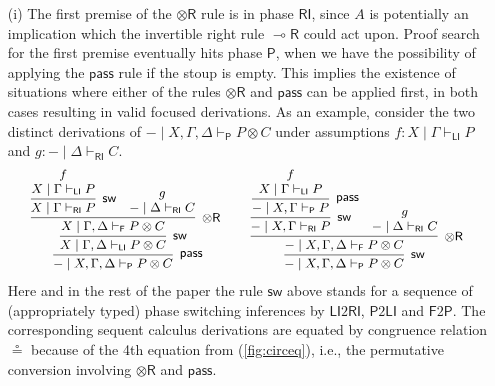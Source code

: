 \documentclass[copyright,creativecommons]{eptcs}
\theoremstyle{definition}
\newcommand{\tr}{\otimes \mathsf{R}}
\newcommand{\lright}{{\multimap}\mathsf{R}}
\newcommand{\pass}{\mathsf{pass}}
\newcommand{\ot}{\otimes}
\newcommand{\RI}{\mathsf{RI}}
\newcommand{\LI}{\mathsf{LI}}
\newcommand{\Pass}{\mathsf{P}}
\newcommand{\F}{\mathsf{F}}
\newcommand{\proofbox}[1]{\begin{tabular}{l} #1 \end{tabular}}
\begin{document}
\begin{enumerate}

\item[(i)] The first premise of the $\tr$ rule is in phase $\RI$, since $A$ is potentially an implication which the invertible right rule $\lright$ could act upon. Proof search for the first premise eventually hits phase $\Pass$, when we have the possibility of applying the $\pass$ rule if the stoup is empty. This implies the existence of situations where either of the rules $\tr$ and $\pass$ can be applied first, in both cases resulting in valid focused derivations.
  As an example, consider the two distinct derivations of ${-} \mid X , \Gamma , \Delta \vdash_{\Pass} P \ot C$ under assumptions $f : X \mid \Gamma \vdash_{\LI} P$ and $g : {-} \mid \Delta \vdash_{\RI} C$.
  \begin{equation}\label{eq:passtr}
  \small
    \proofbox{
      \infer[\pass]{{-} \mid X , \Gamma , \Delta \vdash_{\Pass} P \ot C}{
        \infer[\mathsf{sw}]{X \mid \Gamma , \Delta \vdash_{\LI} P \ot C}{
          \infer[\tr]{X \mid \Gamma , \Delta \vdash_{\F} P \ot C}{
            \infer[\mathsf{sw}]{X \mid \Gamma \vdash_{\RI} P}{
              \deduce{X \mid \Gamma \vdash_{\LI} P}{f}
            }
            &
            \deduce{{-} \mid \Delta \vdash_{\RI} C}{g}
          }
        }
      }
    \qquad
    \infer[\mathsf{sw}]{{-} \mid X , \Gamma , \Delta \vdash_{\Pass} P \ot C}{
      \infer[\tr]{{-} \mid X , \Gamma , \Delta \vdash_{\F} P \ot C}{
        \infer[\mathsf{sw}]{{-} \mid X , \Gamma \vdash_{\RI} P}{
          \infer[\pass]{{-} \mid X , \Gamma \vdash_{\Pass} P}{
            \deduce{X \mid \Gamma \vdash_{\LI} P}{f}
          }
        }
        &
        \deduce{{-} \mid \Delta \vdash_{\RI} C}{g}
      }
    }
    }
  \end{equation}
  Here and in the rest of the paper the rule $\mathsf{sw}$ above stands for a sequence of (appropriately typed) phase
  switching inferences by $\LI2\RI$, $\Pass2\LI$ and $\F2\Pass$.
  The corresponding sequent calculus derivations are equated by congruence relation $\circeq$ because of the 4th equation from (\ref{fig:circeq}), i.e., the permutative conversion involving $\tr$ and $\pass$.


\end{enumerate}
\end{document}
